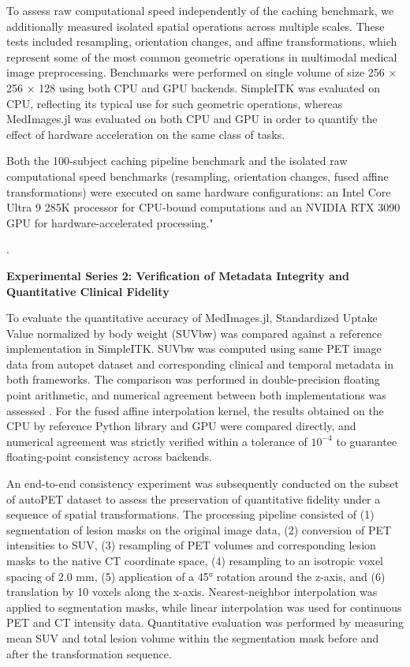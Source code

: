 \documentclass[a4paper,10pt]{elsarticle}
\begin{document}
To assess raw computational speed independently of the caching benchmark, we additionally measured isolated spatial operations across multiple scales. These tests included resampling, orientation changes, and affine transformations, which represent some of the most common geometric operations in multimodal medical image preprocessing. Benchmarks were performed on single volume of size 256 × 256 × 128 using both CPU and GPU backends.  SimpleITK was evaluated on CPU, reflecting its typical use for such geometric operations, whereas MedImages.jl was evaluated on both CPU and GPU in order to quantify the effect of hardware acceleration on the same class of tasks.

Both the 100-subject caching pipeline benchmark and the isolated raw computational speed benchmarks (resampling, orientation changes, fused affine transformations) were executed on same hardware configurations: an Intel Core Ultra 9 285K processor for CPU-bound computations and an NVIDIA RTX 3090 GPU for hardware-accelerated processing."


 . 

\textbf{Experimental Series 2: Verification of Metadata Integrity and Quantitative Clinical Fidelity  }

To evaluate the quantitative accuracy of MedImages.jl, Standardized Uptake Value normalized by body weight (SUVbw) was compared against a reference implementation in SimpleITK. SUVbw was computed using same PET image data from autopet dataset and corresponding clinical and temporal metadata in both frameworks. The comparison was performed in double-precision floating point arithmetic, and numerical agreement between both implementations was assessed .  For the fused affine interpolation kernel, the results obtained on the CPU  by reference Python library and GPU were compared directly, and numerical agreement was strictly verified within a tolerance of $10^{-4}$ to guarantee floating-point consistency across backends.


An end-to-end consistency experiment was subsequently conducted on the subset of autoPET dataset to assess the preservation of quantitative fidelity under a sequence of spatial transformations. The processing pipeline consisted of (1) segmentation of lesion masks on the original image data, (2) conversion of PET intensities to SUV, (3) resampling of PET volumes and corresponding lesion masks to the native CT coordinate space, (4) resampling to an isotropic voxel spacing of 2.0 mm, (5) application of a 45° rotation around the z-axis, and (6) translation by 10 voxels along the x-axis. Nearest-neighbor interpolation was applied to segmentation masks, while linear interpolation was used for continuous PET and CT intensity data.
Quantitative evaluation was performed by measuring mean SUV and total lesion volume within the segmentation mask before and after the transformation sequence.
\end{document}
